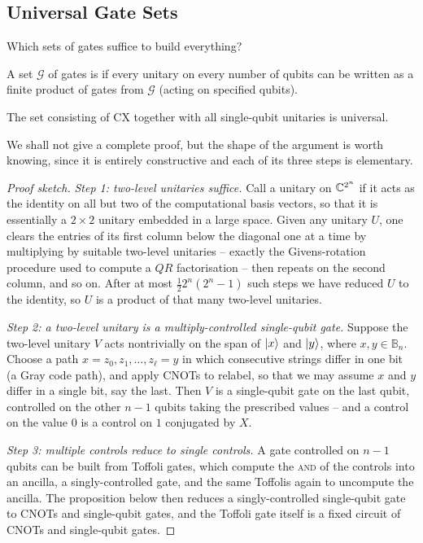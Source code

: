 \documentclass[a4paper]{scrartcl}
\newcommand{\CX}{\mathrm{CX}}
\newcommand{\bits}[1]{\mathbb{B}_{#1}}
\begin{document}
\subsection{Universal Gate Sets}

Which sets of gates suffice to build everything?

\begin{definition}
	A set $\mathcal G$ of gates is  if every unitary on every number of qubits can be written as a finite product of gates from $\mathcal G$ (acting on specified qubits).
\end{definition}

\begin{theorem}
	The set consisting of $\CX$ together with all single-qubit unitaries is universal.
\end{theorem}

We shall not give a complete proof, but the shape of the argument is worth knowing, since it is entirely constructive and each of its three steps is elementary.

\begin{proof}[Proof sketch]
	\emph{Step 1: two-level unitaries suffice.} Call a unitary on $\mathbb{C}^{2^n}$  if it acts as the identity on all but two of the computational basis vectors, so that it is essentially a $2\times2$ unitary embedded in a large space. Given any unitary $U$, one clears the entries of its first column below the diagonal one at a time by multiplying by suitable two-level unitaries -- exactly the Givens-rotation procedure used to compute a $QR$ factorisation -- then repeats on the second column, and so on. After at most $\tfrac12 2^n(2^n-1)$ such steps we have reduced $U$ to the identity, so $U$ is a product of that many two-level unitaries.

	\emph{Step 2: a two-level unitary is a multiply-controlled single-qubit gate.} Suppose the two-level unitary $V$ acts nontrivially on the span of $\ket x$ and $\ket y$, where $x,y\in\bits n$. Choose a path $x = z_0, z_1,\dots,z_\ell = y$ in which consecutive strings differ in one bit (a Gray code path), and apply CNOTs to relabel, so that we may assume $x$ and $y$ differ in a single bit, say the last. Then $V$ is a single-qubit gate on the last qubit, controlled on the other $n-1$ qubits taking the prescribed values -- and a control on the value $0$ is a control on $1$ conjugated by $X$.

	\emph{Step 3: multiple controls reduce to single controls.} A gate controlled on $n-1$ qubits can be built from Toffoli gates, which compute the \textsc{and} of the controls into an ancilla, a singly-controlled gate, and the same Toffolis again to uncompute the ancilla. The proposition below then reduces a singly-controlled single-qubit gate to CNOTs and single-qubit gates, and the Toffoli gate itself is a fixed circuit of CNOTs and single-qubit gates.
\end{proof}
\end{document}
